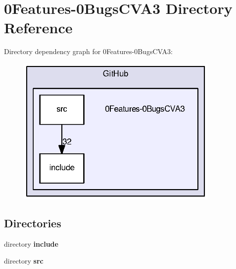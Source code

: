 \section{0\-Features-\/0\-Bugs\-C\-V\-A3 Directory Reference}
\label{dir_278fa936a045abd4050a68cc1167277f}
Directory dependency graph for 0\-Features-\/0\-Bugs\-C\-V\-A3\-:
\nopagebreak
\begin{figure}[H]
\begin{center}
\leavevmode
\includegraphics[width=278pt]{dir_278fa936a045abd4050a68cc1167277f_dep}
\end{center}
\end{figure}
\subsection*{Directories}
\begin{DoxyCompactItemize}
\item 
directory {\bf include}
\item 
directory {\bf src}
\end{DoxyCompactItemize}
